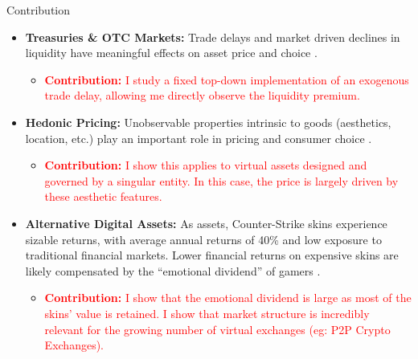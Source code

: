 \documentclass[xcolor=table, envcountsect,12pt]{beamer}
\theoremstyle{remark}
\theoremstyle{theorem}
\theoremstyle{plain}
\begin{document}
\begin{frame}[shrink=20]{Contribution}
	\begin{itemize}
		\item \footnotesize  \textbf{Treasuries \& OTC Markets:} Trade delays and market driven declines in liquidity have meaningful effects on asset price and choice \parencites{dgp_2005}{dgp_2007}{krishna_2002}{lagos_rocheteau_2007}{amihud_et_al_2006}{geromichalos_et_al_2016}.
		\begin{itemize}
			\item \footnotesize  \textcolor{red}{\textbf{Contribution:} I study a fixed top-down implementation of an exogenous trade delay, allowing me directly observe the liquidity premium.}
		\end{itemize}
		\item \footnotesize  \textbf{Hedonic Pricing:} Unobservable properties intrinsic to goods (aesthetics, location, etc.) play an important role in pricing and consumer choice \parencites{lancaster_1966}{rosen_1974}{rosen1986}{sirmans_2005}.
		\begin{itemize}
			\item \footnotesize  \textcolor{red}{\textbf{Contribution:} I show this applies to virtual assets designed and governed by a singular entity. In this case, the price is largely driven by these aesthetic features.}
		\end{itemize}
		\item \footnotesize  \textbf{Alternative Digital Assets:} As assets, Counter-Strike skins experience sizable returns, with average annual returns of 40\% and low exposure to traditional financial markets. Lower financial returns on expensive skins are likely compensated by the ``emotional dividend'' of gamers \parencite{dobrynskaya_2025}.
		\begin{itemize}
			\item \footnotesize \textcolor{red}{\textbf{Contribution:} I show that the emotional dividend is large as most of the skins' value is retained. I show that market structure is incredibly relevant for the growing number of virtual exchanges (eg: P2P Crypto Exchanges).}
		\end{itemize}
	\end{itemize}
\end{frame}

\end{document}
